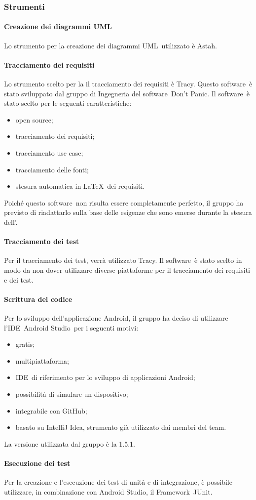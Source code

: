 \documentclass[../NormeProgetto.text]{subfiles}
\begin{document}
		\subsubsection{Strumenti}
			\paragraph{Creazione dei diagrammi UML}
				Lo strumento per la creazione dei diagrammi UML\g\ utilizzato è Astah\g.
			\paragraph{Tracciamento dei requisiti}
				Lo strumento scelto per la il tracciamento dei requisiti è Tracy\g. Questo software\g\ è stato sviluppato dal gruppo di Ingegneria del software\g\ Don't Panic. Il software\g\ è stato scelto per le seguenti caratteristiche:
			\begin{itemize}
				\item open source\g;
				\item tracciamento dei requisiti;
				\item tracciamento use case;
				\item tracciamento delle fonti;
				\item stesura automatica in \LaTeX\g\ dei requisiti.
			\end{itemize}
               Poiché questo software\g\ non risulta essere completamente perfetto, il gruppo ha previsto di riadattarlo sulla base delle esigenze che sono emerse durante la stesura dell'\analisideirequisiti .
 			\paragraph{Tracciamento dei test}
 				Per il tracciamento dei test, verrà utilizzato Tracy\g. Il software\g\ è stato scelto in modo da non dover utilizzare diverse piattaforme per il tracciamento dei requisiti e dei test.
			\paragraph{Scrittura del codice} 			
 				Per lo sviluppo dell'applicazione Android\g, il gruppo ha deciso di utilizzare l'IDE\g\ Android Studio\g\ per i seguenti motivi:
 				\begin{itemize}
 					\item gratis;
 					\item multipiattaforma;
 					\item IDE\g\ di riferimento per lo sviluppo di applicazioni Android\g;
 					\item possibilità di simulare un dispositivo;
 					\item integrabile con GitHub\g;
 					\item basato su IntelliJ Idea\g, strumento già utilizzato dai membri del team\g.
 				\end{itemize}
 				La versione utilizzata dal gruppo è la 1.5.1.
 			\paragraph{Esecuzione dei test}
 				Per la creazione e l'esecuzione dei test di unità e di integrazione, è possibile utilizzare, in combinazione con Android Studio\g, il Framework\g\ JUnit\g.
 			
			
\end{document}
